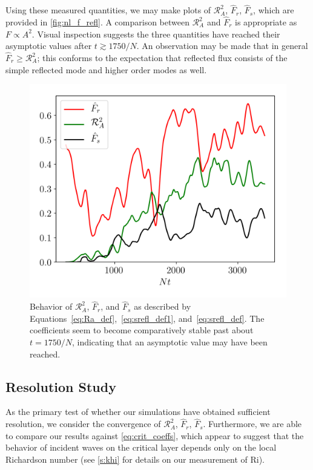 \documentclass[
        fleqn,
        usenatbib,
        referee,
    ]{mnras}
\begin{document}
Using these measured quantities, we may make plots of $\mathcal{R}_A^2$,
$\hat{F}_r$, $\hat{F}_s$, which are provided in \autoref{fig:nl_f_refl}. A
comparison between $\mathcal{R}_A^2$ and $\hat{F}_r$ is appropriate as $F
\propto A^2$. Visual inspection suggests the three quantities have reached their
asymptotic values after $t \gtrsim 1750/N$. An observation may be made that in
general $\hat{F}_r \geq \mathcal{R}_A^2$; this conforms to the expectation
that reflected flux consists of the simple reflected mode and higher order modes
as well.

\begin{figure}
    \centering
    \includegraphics[width=\columnwidth]{plots/nl_f_refl.png}
    \caption{Behavior of $\mathcal{R}_A^2$, $\hat{F}_r$, and $\hat{F}_s$ as
    described by Equations~\ref{eq:Ra_def},~\ref{eq:srefl_def1},
    and~\ref{eq:srefl_def}. The coefficients seem to become comparatively stable
    past about $t = 1750/N$, indicating that an asymptotic value may have been
    reached.}\label{fig:nl_f_refl}
\end{figure}

\subsection{Resolution Study}\label{ss:convergence}

As the primary test of whether our simulations have obtained sufficient
resolution, we consider the convergence of $\mathcal{R}_A^2$, $\hat{F}_r$,
$\hat{F}_s$. Furthermore, we are able to compare our results against
\autoref{eq:crit_coeffs}, which appear to suggest that the behavior of incident
waves on the critical layer depends only on the local Richardson number (see
\autoref{s:khi} for details on our measurement of $\mathrm{Ri}$).
\end{document}
